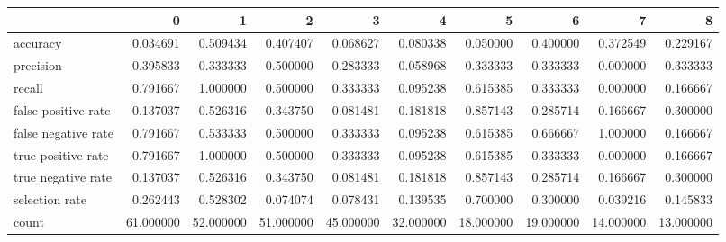 \begin{tabular}{lrrrrrrrrr}
\toprule
{} &          0 &          1 &          2 &          3 &          4 &          5 &          6 &          7 &          8 \\
\midrule
accuracy            &   0.034691 &   0.509434 &   0.407407 &   0.068627 &   0.080338 &   0.050000 &   0.400000 &   0.372549 &   0.229167 \\
precision           &   0.395833 &   0.333333 &   0.500000 &   0.283333 &   0.058968 &   0.333333 &   0.333333 &   0.000000 &   0.333333 \\
recall              &   0.791667 &   1.000000 &   0.500000 &   0.333333 &   0.095238 &   0.615385 &   0.333333 &   0.000000 &   0.166667 \\
false positive rate &   0.137037 &   0.526316 &   0.343750 &   0.081481 &   0.181818 &   0.857143 &   0.285714 &   0.166667 &   0.300000 \\
false negative rate &   0.791667 &   0.533333 &   0.500000 &   0.333333 &   0.095238 &   0.615385 &   0.666667 &   1.000000 &   0.166667 \\
true positive rate  &   0.791667 &   1.000000 &   0.500000 &   0.333333 &   0.095238 &   0.615385 &   0.333333 &   0.000000 &   0.166667 \\
true negative rate  &   0.137037 &   0.526316 &   0.343750 &   0.081481 &   0.181818 &   0.857143 &   0.285714 &   0.166667 &   0.300000 \\
selection rate      &   0.262443 &   0.528302 &   0.074074 &   0.078431 &   0.139535 &   0.700000 &   0.300000 &   0.039216 &   0.145833 \\
count               &  61.000000 &  52.000000 &  51.000000 &  45.000000 &  32.000000 &  18.000000 &  19.000000 &  14.000000 &  13.000000 \\
\bottomrule
\end{tabular}
